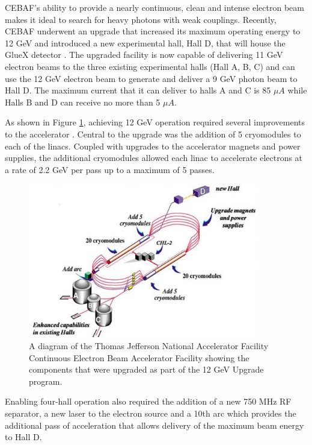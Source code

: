 CEBAF's ability to provide a nearly continuous, clean and intense electron
beam makes it ideal to search for heavy photons with weak couplings. Recently,
CEBAF underwent an upgrade that increased its maximum operating energy to 12
GeV and introduced a new experimental hall, Hall D, that will house the
GlueX detector \cite{Dudek:2012vr}.  The upgraded facility is now capable of 
delivering 11 GeV electron beams to the three existing experimental halls
(Hall A, B, C) and can use the 12 GeV electron beam to generate and deliver a 9
GeV photon beam to Hall D.  The maximum current that it can deliver to halls
A and C is 85 $\mu A$ while Halls B and D can receive no more than 5 $\mu A$.

As shown in Figure \ref{fig:cebaf}, achieving 12 GeV operation required several
improvements to the accelerator \cite{Burkert:2012rh}. Central to the upgrade 
was the addition of 5 
cryomodules to each of the linacs.  Coupled with upgrades to the accelerator
magnets and power supplies, the additional cryomodules allowed each linac to
accelerate electrons at a rate of 2.2 GeV per pass up to a maximum of 5 passes.
\begin{figure}[h]
    \centering
    \includegraphics[width=0.9\textwidth]{images/cebaf.jpg}
    \caption{A diagram of the Thomas Jefferson National Accelerator Facility
             Continuous Electron Beam Accelerator Facility showing the 
             components that were upgraded as part of the 12 GeV Upgrade 
             program.}
    \label{fig:cebaf}
\end{figure}
Enabling four-hall operation also required the addition of a new 750 MHz RF 
separator, a new laser to the electron source and a 10th arc which provides
the additional pass of acceleration that allows 
delivery of the maximum beam energy to Hall D.



